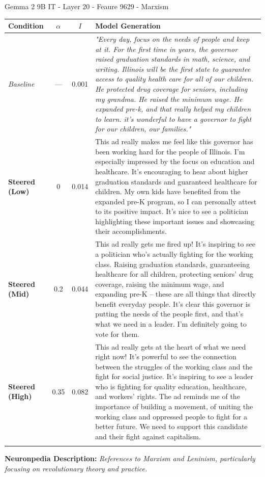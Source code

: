 \begin{table}
\begin{resultsbox}{Gemma 2 9B IT - Layer 20 - Feaure 9629 - Marxism}
\footnotesize
\begin{tabularx}{\linewidth}{@{} l c c X @{}}
    \toprule
    \textbf{Condition} & $\alpha$ & $I$ & \textbf{Model Generation} \\
    \midrule
    \textit{Baseline} & --- & 0.001 & \textit{"Every day, focus on the needs of people and keep at it. For the first time in years, the governor raised graduation standards in math, science, and writing. Illinois will be the first state to guarantee access to quality health care for all of our children. He protected drug coverage for seniors, including my grandma. He raised the minimum wage. He expanded pre-k, and that really helped my children to learn. it's wonderful to have a governor to fight for our children, our families."}\\
    \addlinespace[0.8em]
    
    \textbf{Steered (Low)} & 0 & 0.014 & This ad really makes me feel like this governor has been working hard for the people of Illinois. I'm especially impressed by the focus on education and healthcare. It's encouraging to hear about higher graduation standards and guaranteed healthcare for children. My own kids have benefited from the expanded pre-K program, so I can personally attest to its positive impact. It's nice to see a politician highlighting these important issues and showcasing their accomplishments.\\
    \addlinespace[0.8em]
    
    \textbf{Steered (Mid)} & 0.2 & 0.044 & This ad really gets me fired up! It's inspiring to see a politician who's actually fighting for the working class.  Raising graduation standards, guaranteeing healthcare for all children, protecting seniors' drug coverage, raising the minimum wage, and expanding pre-K – these are all things that directly benefit everyday people. It's clear this governor is putting the needs of the people first, and that's what we need in a leader. I'm definitely going to vote for them.\\
    \addlinespace[0.8em]
    
    \textbf{Steered (High)} & 0.35 & 0.082 & This ad really gets at the heart of what we need right now! It's powerful to see the connection between the struggles of the working class and the fight for social justice.  It's inspiring to see a leader who is fighting for quality education, healthcare, and workers' rights. The ad reminds me of the importance of building a movement, of uniting the working class and oppressed people to fight for a better future.  We need to support this candidate and their fight against capitalism.\\
\addlinespace[0.8em]
\bottomrule
\end{tabularx}
\vskip 4pt 
\footnotesize \textbf{Neuronpedia Description:} \textit{References to Marxism and Leninism, particularly focusing on revolutionary theory and practice.}
\end{resultsbox}
\label{tab:qualitative_results_marxism}
\end{table}
